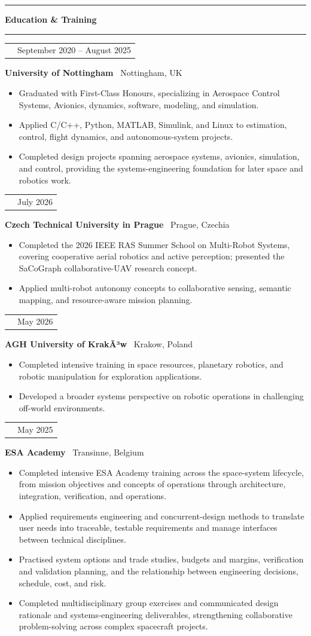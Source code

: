 \documentclass[10pt,a4paper]{article}
\makeatletter
\newcommand{\SectionSize}{11.5pt}
\newcommand{\RoleSize}{10.3pt}
\newcommand{\CompanySize}{9.6pt}
\newcommand{\DurationSize}{9pt}
\newcommand{\BodySize}{9.2pt}
\newcommand{\SectionLineSize}{12pt}
\newcommand{\RoleLineSize}{11.5pt}
\newcommand{\CompanyLineSize}{10.8pt}
\newcommand{\DurationLineSize}{9pt}
\newcommand{\BodyLineSize}{11pt}
\newcommand{\SectionBefore}{4pt}
\newcommand{\SectionLineToTitle}{0pt}
\newcommand{\SectionTitleToLine}{2pt}
\newcommand{\SectionLineToEntry}{0pt}
\newcommand{\EntryBefore}{0pt}
\newcommand{\RoleToCompany}{-5pt}
\newcommand{\CompanyToBullets}{3pt}
\newcommand{\EntryAfter}{6pt}
\newcommand{\BulletSpacing}{2pt}
\newcommand{\BulletBefore}{0pt}
\newcommand{\BulletIndent}{1.25em}
\newcommand{\SectionLineThickness}{1.5pt}
\newcommand{\SubsectionLineThickness}{0.4pt}
\newcommand{\DurationWidth}{4.5cm}
\newcommand{\CVSection}[1]{

    \vspace{\SectionBefore}


    \noindent
    \textcolor{CVBlack}{
        \rule{\textwidth}{\SectionLineThickness}
    }

    \vspace{\SectionLineToTitle}


    {\fontsize{\SectionSize}{\SectionLineSize}
    \selectfont
    \textbf{\textcolor{CVBlack}{#1}}}

    \vspace{\SectionTitleToLine}


    \noindent
    \textcolor{CVLightGray}{
        \rule{\textwidth}{\SubsectionLineThickness}
    }

    \vspace{\SectionLineToEntry}
}
\newcommand{\CVEntry}[5]{

    \vspace{\EntryBefore}


    \noindent
    \begin{tabularx}{\textwidth}{
        @{}
        >{\raggedright\arraybackslash}X
        >{\raggedleft\arraybackslash}p{\DurationWidth}
        @{}
    }

        {\fontsize{\RoleSize}{\RoleLineSize}
        \selectfont
        \textbf{\textcolor{CVBlack}{#1}}}
        &
        {\fontsize{\DurationSize}{\DurationLineSize}
        \selectfont
        \textcolor{CVGray}{#4}}

    \end{tabularx}

    \vspace{\RoleToCompany}


    \noindent
    {\fontsize{\CompanySize}{\CompanyLineSize}
    \selectfont
    \textbf{\textcolor{CVDarkGray}{#2}}
    \textcolor{CVGray}{\textbar\ #3}}

    \vspace{\CompanyToBullets}


    \begin{itemize}[
        leftmargin=\BulletIndent,
        itemsep=\BulletSpacing,
        topsep=\BulletBefore,
        parsep=0pt,
        partopsep=0pt
    ]
        #5
    \end{itemize}

    \vspace{\EntryAfter}
}
\newcommand{\CVBullet}[1]{
    \item
    {\fontsize{\BodySize}{\BodyLineSize}
    \selectfont
    \textcolor{CVDarkGray}{#1}}
}
\makeatother
\begin{document}
\CVSection{Education \& Training}

\CVEntry
{MEng Aerospace Engineering -- First-Class Honours}
{University of Nottingham}
{Nottingham, UK}
{September 2020 -- August 2025}
{
    \CVBullet{Graduated with First-Class Honours, specializing in Aerospace Control Systems, Avionics, dynamics, software, modeling, and simulation.}

    \CVBullet{Applied C/C++, Python, MATLAB, Simulink, and Linux to estimation, control, flight dynamics, and autonomous-system projects.}

    \CVBullet{Completed design projects spanning aerospace systems, avionics, simulation, and control, providing the systems-engineering foundation for later space and robotics work.}
}

\CVEntry
{IEEE RAS Summer School on Multi-Robot Systems}
{Czech Technical University in Prague}
{Prague, Czechia}
{July 2026}
{
    \CVBullet{Completed the 2026 IEEE RAS Summer School on Multi-Robot Systems, covering cooperative aerial robotics and active perception; presented the SaCoGraph collaborative-UAV research concept.}

    \CVBullet{Applied multi-robot autonomy concepts to collaborative sensing, semantic mapping, and resource-aware mission planning.}
}

\CVEntry
{Space Resources \& Robotics Summer School}
{AGH University of KrakÃ³w}
{Krakow, Poland}
{May 2026}
{
    \CVBullet{Completed intensive training in space resources, planetary robotics, and robotic manipulation for exploration applications.}

    \CVBullet{Developed a broader systems perspective on robotic operations in challenging off-world environments.}
}

\CVEntry
{Space Systems Engineering Training Course}
{ESA Academy}
{Transinne, Belgium}
{May 2025}
{
    \CVBullet{Completed intensive ESA Academy training across the space-system lifecycle, from mission objectives and concepts of operations through architecture, integration, verification, and operations.}

    \CVBullet{Applied requirements engineering and concurrent-design methods to translate user needs into traceable, testable requirements and manage interfaces between technical disciplines.}

    \CVBullet{Practised system options and trade studies, budgets and margins, verification and validation planning, and the relationship between engineering decisions, schedule, cost, and risk.}

    \CVBullet{Completed multidisciplinary group exercises and communicated design rationale and systems-engineering deliverables, strengthening collaborative problem-solving across complex spacecraft projects.}
}
\end{document}

